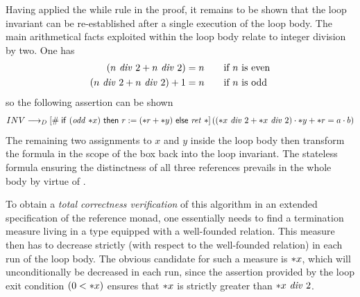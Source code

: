 Having applied the while rule  in the proof, it remains to be
shown that the loop invariant can be re-established after a single execution of
the loop body. The main arithmetical facts exploited within the loop body relate
to integer division by two. One has
\begin{align*}
  (n\ \mathit{div}\ 2 + n\ \mathit{div}\ 2) &= n \qquad \text{if $n$ is even}\\
  (n\ \mathit{div}\ 2 + n\ \mathit{div}\ 2) + 1 &= n \qquad \text{if $n$ is odd}\\
\end{align*}
so the following assertion can be shown
\[
  INV \longrightarrow_D \PDLSBox{\If\ (\op{odd}\ \rd{x})\ \Then\ r:=(\rd{r} + \rd{y})\ \Else\
    \ret\ \unit}{\left((\rd{x}\ \op{div}\ 2 + \rd{x}\ \op{div}\ 2) \cdot \rd{y}
    + \rd{r} = a\cdot b\right)}
\]
The remaining two assignments to $x$ and $y$ inside the loop body then transform
the formula in the scope of the box back into the loop invariant. The stateless
formula ensuring the distinctness of all three references prevails in the
whole body by virtue of \irule{pdl-k3B}.

To obtain a \emph{total correctness verification} of this algorithm in an
extended specification of the reference monad, one essentially needs to find a
termination measure living in a type equipped with a well-founded relation. This
measure then has to decrease strictly (with respect to the well-founded
relation) in each run of the loop body. The obvious candidate for such a measure is
${\ast x}$, which will unconditionally be decreased in each run, since the
assertion provided by the loop exit condition $(0 < {\ast x})$ ensures that
${\ast x}$ is strictly greater than ${\ast x}\ \mathit{div}\ 2$.

